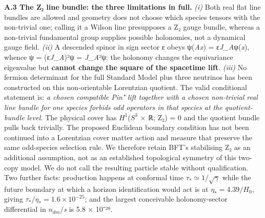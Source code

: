 \documentclass[
]{article}
\begin{document}
\textbf{A.3 The Z₂ line bundle: the three limitations in full.}
\emph{(i)} Both real flat line bundles are allowed and geometry does not
choose which species tensors with the non-trivial one; calling it a
Wilson line presupposes a Z₂ gauge bundle, whereas a non-trivial
fundamental group supplies possible holonomies, not a dynamical gauge
field. \emph{(ii)} A descended spinor in sign sector ε obeys
ψ(\emph{Ax}) = ε\emph{J\_A}ψ(\emph{x}), whence ψ = (ε\emph{J\_A})²ψ =
\emph{J\_A}²ψ: the holonomy changes the equivariance eigenvalue but
\textbf{cannot change the square of the spacetime lift}. \emph{(iii)} No
fermion determinant for the full Standard Model plus three neutrinos has
been constructed on this non-orientable Lorentzian quotient. The valid
conditional statement is: \emph{a chosen compatible Pin⁺ lift together
with a chosen non-trivial real line bundle for one species forbids odd
operators in that species at the quotient-bundle level.} The physical
cover has \(H^1\)(\(S^3\) × ℝ; Z₂) = 0 and the quotient bundle pulls
back trivially. The proposed Euclidean boundary condition has not been
continued into a Lorentzian cover matter action and measure that
preserve the same odd-species selection rule. We therefore retain BFT's
stabilising Z₂ as an additional assumption, not as an established
topological symmetry of this two-copy model. We do not call the
resulting particle stable without qualification. Two further facts:
production happens at conformal time \(\tau_*\simeq1/\sqrt\gamma\) while
the future boundary at which a horizon identification would act is at
\(\eta_*=4.39/H_0\), giving \(\tau_*/\eta_*=1.6\times10^{-25}\); and the
largest conceivable holonomy-sector differential in \(n_{dm}\)/\emph{s}
is 5.8 × 10⁻²⁶.
\end{document}
